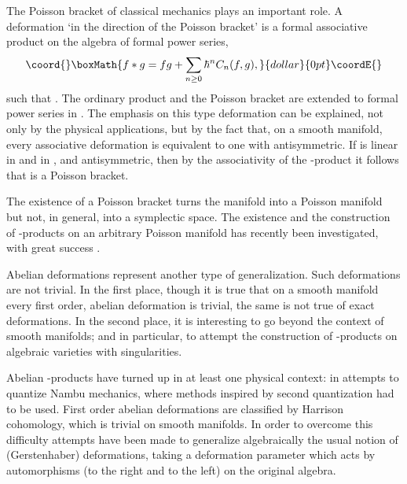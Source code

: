 \documentclass[a4paper,a4paper]{article}
\begin{document}
The Poisson bracket of classical mechanics plays an important role.
A deformation `in the direction of the Poisson bracket' is a formal
associative product on the algebra of formal power series,
$$\coord{}\boxMath{
f*g = fg + \sum_{n\geq 0}\hbar^nC_n(f,g),
}{dollar}{0pt}\coordE{}$$
such that \coordHE{}. The ordinary product \coordHE{} and the 
Poisson bracket \coordHE{} are extended to formal power series in \myHighlight{$\hbar$}\coordHE{}.
The emphasis on this type deformation can be explained, not only by the
physical applications, but by the fact that, on a smooth manifold,
every associative deformation is equivalent to one with \coordHE{}
antisymmetric. If \coordHE{} is linear in \coordHE{} and in \coordHE{},  and
antisymmetric,  then by the associativity of the \myHighlight{$*$}\coordHE{}-product it follows
that \coordHE{} is a Poisson bracket. 

The existence of a Poisson bracket turns the manifold into a Poisson
manifold but not, in general, into a symplectic space. The existence and
the construction of \myHighlight{$*$}\coordHE{}-products on an arbitrary Poisson manifold has
recently been investigated, with great success \cite{K,T}.

Abelian deformations represent another type of generalization. Such
deformations are not trivial. In the first place, though it is true that on a
smooth manifold every first order, abelian deformation is trivial, the
same is not true of exact deformations. In the second place, it is
interesting to go beyond the context of smooth manifolds; and 
in particular, to attempt the construction of
\myHighlight{$*$}\coordHE{}-products on algebraic varieties with singularities.

Abelian \myHighlight{$*$}\coordHE{}-products have turned up in at least one physical context:
in attempts to quantize Nambu mechanics\cite{DFST}, where methods %
inspired by second quantization had to be used. First order abelian 
deformations are classified by Harrison cohomology\cite{B,H}, 
which is trivial on smooth manifolds.
In order to overcome this difficulty attempts have been made \cite{N,P} to
generalize algebraically the usual notion \cite{GS} of (Gerstenhaber) 
deformations, taking a deformation parameter which acts by automorphisms
(to the right and to the left) on the original algebra.
\end{document}
